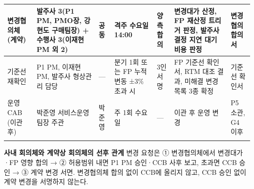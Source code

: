 \documentclass[10pt,a4paper]{article}
\begin{document}
{\begin{tabularx}{\linewidth}{|L{26mm}|Y|L{18mm}|L{26mm}|L{28mm}|Y|L{26mm}|}
변경협의체 (계약) & 발주사 3(P1 PM, PMO장, 강현도 구매팀장) + 수행사 3(이재현 PM 외 2) & 공동 & 격주 수요일 14:00 & 양측 합의 & 변경대가 산정, FP 재산정 트리거 판정, 발주사 결정 지연 대기 비용 판정 & 변경협의 합의서 \\ \hline
기준선 재확인 & P1 PM, 이재현 PM, 발주사 형상관리 담당 & — & 분기 1회 또는 FP 누적 변동 ±3\% 초과 시 & 3인 서명 & FP 기준선 확인서, RTM 대조 결과, 미해결 변경 목록 3종 확정 & 기준선 확인서 \\ \hline
운영 CAB (이관 후) & 박준영 서비스운영팀장 주관 & 박준영 & 주 1회 수요일 & — & 이관 후 운영 변경 & P5 소관, G4 이후 \\ \hline
\fi
\end{tabularx}}
\begin{fieldbox}
\textbf{사내 회의체와 계약상 회의체의 선후 관계} 
\ifwbblank
{}
\else
변경 요청은 ① 변경협의체에서 변경대가·FP 영향 합의 → ② 허용범위 내면 P1 PM 승인·CCB 사후 보고, 초과면 CCB 승인 → ③ 계약 변경 서면. 변경협의체 합의 없이 CCB에 올리지 않고, CCB 승인 없이 계약 변경을 서명하지 않는다.
\fi
\end{fieldbox}
\end{document}
